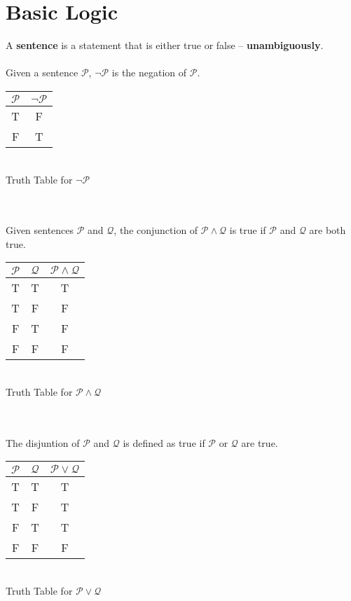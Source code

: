 \documentclass[../base/set_theory.tex]{subfiles}
\begin{document}
\section{Basic Logic}
A \textbf{sentence} is a statement that is either true or false --
\textbf{unambiguously}.\\\\
\break
Given a sentence $\mathcal{P}$, $\neg \mathcal{P}$ is the negation of
$\mathcal{P}$.\\
\begin{center}
    \begin{tabular}{c|c}
    $\mathcal{P}$ & $\neg \mathcal{P}$ \\ \hline
    T & F \\
    F & T \\
    \end{tabular}
    \\[10pt]
    \caption{Truth Table for $\neg \mathcal{P}$}
\end{center}
\\\\
Given sentences $\mathcal{P}$ and $\mathcal{Q}$, the conjunction of
$\mathcal{P}\land \mathcal{Q}$ is true if $\mathcal{P}$ and $\mathcal{Q}$
are both true.\\
\begin{center}
    \begin{tabular}{c|c|c}
    $\mathcal{P}$ & $\mathcal{Q}$ & $\mathcal{P}\land \mathcal{Q}$ \\ \hline
    T & T & T \\ 
    T & F & F \\ 
    F & T & F \\  
    F & F & F \\
    \end{tabular}
    \\[10pt]
    \caption{Truth Table for $\mathcal{P}\land \mathcal{Q}$}
\end{center}
\\\\
The disjuntion of $\mathcal{P}$ and $\mathcal{Q}$ is defined as true if
$\mathcal{P}$ or $\mathcal{Q}$ are true.\\
\begin{center}
    \begin{tabular}{c|c|c}
    $\mathcal{P}$ & $\mathcal{Q}$ & $\mathcal{P}\lor \mathcal{Q}$ \\ \hline
    T & T & T \\ 
    T & F & T \\ 
    F & T & T \\  
    F & F & F \\
    \end{tabular}
    \\[10pt]
    \caption{Truth Table for $\mathcal{P}\lor \mathcal{Q}$}
\end{center}
\end{document}

